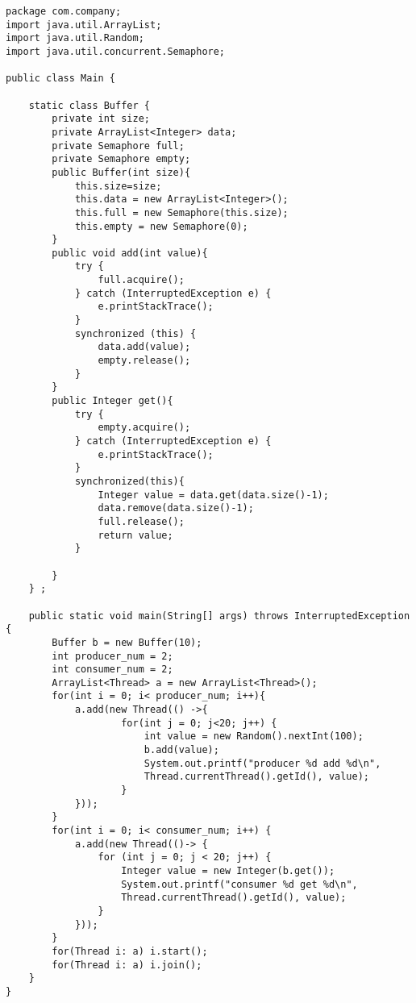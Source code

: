 \begin{lstlisting}
package com.company;
import java.util.ArrayList;
import java.util.Random;
import java.util.concurrent.Semaphore;

public class Main {

    static class Buffer {
        private int size;
        private ArrayList<Integer> data;
        private Semaphore full;
        private Semaphore empty;
        public Buffer(int size){
            this.size=size;
            this.data = new ArrayList<Integer>();
            this.full = new Semaphore(this.size);
            this.empty = new Semaphore(0);
        }
        public void add(int value){
            try {
                full.acquire();
            } catch (InterruptedException e) {
                e.printStackTrace();
            }
            synchronized (this) {
                data.add(value);
                empty.release();
            }
        }
        public Integer get(){
            try {
                empty.acquire();
            } catch (InterruptedException e) {
                e.printStackTrace();
            }
            synchronized(this){
                Integer value = data.get(data.size()-1);
                data.remove(data.size()-1);
                full.release();
                return value;
            }

        }
    } ;

    public static void main(String[] args) throws InterruptedException {
        Buffer b = new Buffer(10);
        int producer_num = 2;
        int consumer_num = 2;
        ArrayList<Thread> a = new ArrayList<Thread>();
        for(int i = 0; i< producer_num; i++){
            a.add(new Thread(() ->{
                    for(int j = 0; j<20; j++) {
                        int value = new Random().nextInt(100);
                        b.add(value);
                        System.out.printf("producer %d add %d\n",
                        Thread.currentThread().getId(), value);
                    }
            }));
        }
        for(int i = 0; i< consumer_num; i++) {
            a.add(new Thread(()-> {
                for (int j = 0; j < 20; j++) {
                    Integer value = new Integer(b.get());
                    System.out.printf("consumer %d get %d\n",
                    Thread.currentThread().getId(), value);
                }
            }));
        }
        for(Thread i: a) i.start();
        for(Thread i: a) i.join();
    }
}
\end{lstlisting}





